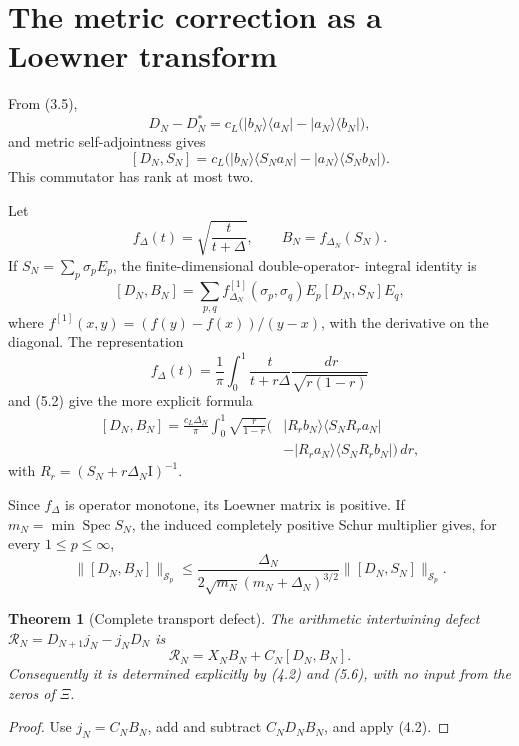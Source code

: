 \documentclass[11pt]{amsart}
\newtheorem{theorem}{Theorem}[section]
\theoremstyle{definition}
\theoremstyle{remark}
\newcommand{\Schatten}{\mathcal S}
\newcommand{\Spec}{\operatorname{Spec}}
\newcommand{\id}{\mathrm I}
\newcommand{\XiR}{\Xi}
\newcommand{\dd}{\,d}
\begin{document}
\section{The metric correction as a Loewner transform}
\label{sec:loewner}

From (3.5),
\[
 D_N-D_N^*
 =c_L\bigl(|b_N\rangle\langle a_N|-|a_N\rangle\langle b_N|\bigr),
\tag{5.1}
\]
and metric self-adjointness gives
\[
\boxed{
[D_N,S_N]
=c_L\bigl(|b_N\rangle\langle S_Na_N|
          -|a_N\rangle\langle S_Nb_N|\bigr).}
\tag{5.2}
\]
This commutator has rank at most two.

Let
\[
 f_\Delta(t)=\sqrt{\frac{t}{t+\Delta}},
 \qquad B_N=f_{\Delta_N}(S_N).
\tag{5.3}
\]
If \(S_N=\sum_p\sigma_pE_p\), the finite-dimensional double-operator-
integral identity is
\[
\boxed{
[D_N,B_N]
=\sum_{p,q}f_{\Delta_N}^{[1]}(\sigma_p,\sigma_q)
 E_p[D_N,S_N]E_q,}
\tag{5.4}
\]
where \(f^{[1]}(x,y)=(f(y)-f(x))/(y-x)\), with the derivative on the
diagonal.  The representation
\[
 f_\Delta(t)=\frac1\pi\int_0^1
 \frac{t}{t+r\Delta}\frac{\dd r}{\sqrt{r(1-r)}}
\tag{5.5}
\]
and (5.2) give the more explicit formula
\[
\boxed{
\begin{aligned}
[D_N,B_N]
=\frac{c_L\Delta_N}{\pi}\int_0^1\sqrt{\frac r{1-r}}
\bigl(&|R_rb_N\rangle\langle S_NR_ra_N|\\
      &-|R_ra_N\rangle\langle S_NR_rb_N|\bigr)\dd r,
\end{aligned}}
\tag{5.6}
\]
with \(R_r=(S_N+r\Delta_N\id)^{-1}\).

Since \(f_\Delta\) is operator monotone, its Loewner matrix is positive.
If \(m_N=\min\Spec S_N\), the induced completely positive Schur multiplier
gives, for every \(1\le p\le\infty\),
\[
\boxed{
 \|[D_N,B_N]\|_{\Schatten_p}
 \le
 \frac{\Delta_N}
 {2\sqrt{m_N}(m_N+\Delta_N)^{3/2}}
 \|[D_N,S_N]\|_{\Schatten_p}.}
\tag{5.7}
\]

\begin{theorem}[Complete transport defect]
The arithmetic intertwining defect
\(\mathcal R_N=D_{N+1}j_N-j_ND_N\) is
\[
\boxed{\mathcal R_N=X_NB_N+C_N[D_N,B_N].}
\tag{5.8}
\]
Consequently it is determined explicitly by (4.2) and (5.6), with no input
from the zeros of \(\XiR\).
\end{theorem}

\begin{proof}
Use \(j_N=C_NB_N\), add and subtract \(C_ND_NB_N\), and apply (4.2).
\end{proof}
\end{document}
